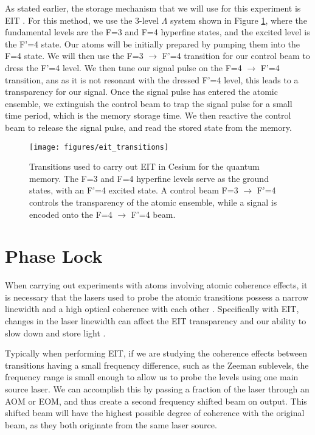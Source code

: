 As stated earlier, the storage mechanism that we will use for this experiment is
EIT \cite{harris1997electromagnetically}.  For this method, we use the 3-level
$\Lambda$ system shown in Figure \ref{fig:eit_transitions}, where the
fundamental levels are the F=3 and F=4 hyperfine states, and the excited level
is the F'=4 state.  Our atoms will be initially prepared by pumping them into
the F=4 state.  We will then use the F=3 $\to$ F'=4 transition for our control
beam to dress the F'=4 level.  We then tune our signal pulse on the F=4 $\to$
F'=4 transition, ans as it is not resonant with the dressed F'=4 level, this
leads to a transparency for our signal.  Once the signal pulse has entered the atomic ensemble, we extinguish the control beam to trap the signal pulse for a small time period, which is the memory storage time.  We then reactive the control beam to release the signal pulse, and read the stored state from the memory.

\begin{figure}[!ht] 
 \centering 
 \texttt{[image: figures/eit\_transitions]} 
 \caption[EIT transitions for Cesium quantum memory]{Transitions used to carry out EIT in Cesium for the quantum memory.  The F=3 and F=4 hyperfine levels serve as the ground states, with an F'=4 excited state.  A control beam F=3 $\to$ F'=4 controls the transparency of the atomic ensemble, while a signal is encoded onto the F=4 $\to$ F'=4 beam.} 
 \label{fig:eit_transitions} 
\end{figure}
 

\section{Phase Lock}

When carrying out experiments with atoms involving atomic coherence effects, it is necessary that the lasers used to probe the atomic transitions possess a narrow linewidth and a high optical coherence with each other \cite{hockel2009robust}.  Specifically with EIT, changes in the laser linewidth can affect the EIT transparency and our ability to slow down and store light \cite{lu2008realization}.

Typically when performing EIT, if we are studying the coherence effects between transitions having a small frequency difference, such as the Zeeman sublevels, the frequency range is small enough to allow us to probe the levels using one main source laser.  We can accomplish this by passing a fraction of the laser through an AOM or EOM, and thus create a second frequency shifted beam on output.  This shifted beam will have the highest possible degree of coherence with the original beam, as they both originate from the same laser source.

